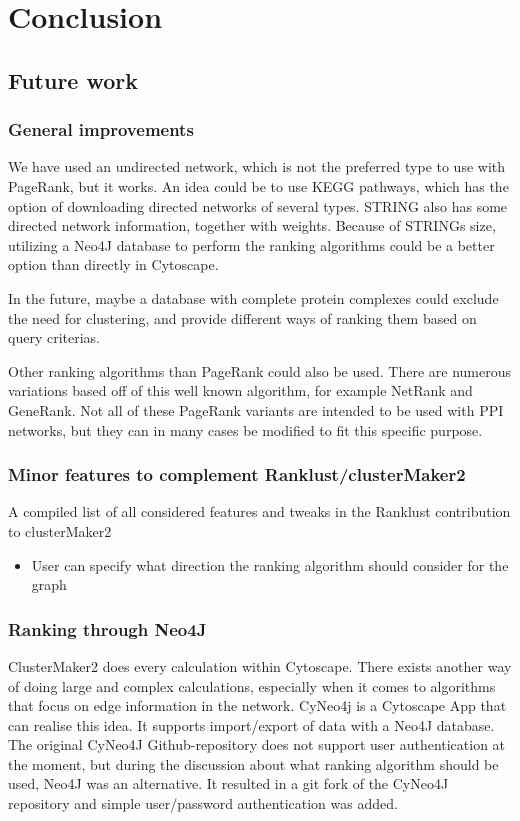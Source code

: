\part{Conclusion}
\label{pa:conclusion}
\chapter{Future work}
\section{General improvements}
We have used an undirected network, which is not the preferred type to use with
PageRank, but it works. An idea could be to use KEGG pathways\cite{kegg}, which
has the option of downloading directed networks of several types.
STRING\cite{str} also has some directed network information, together with
weights. Because of STRINGs size, utilizing a Neo4J database to perform the
ranking algorithms could be a better option than directly in Cytoscape.

In the future, maybe a database with complete protein complexes could exclude
the need for clustering, and provide different ways of ranking them based on
query criterias.

Other ranking algorithms than PageRank could also be used. There are numerous
variations based off of this well known algorithm, for example NetRank and
GeneRank\cite{netrank,generank}. Not all of these PageRank variants are intended
to be used with PPI networks, but they can in many cases be modified to fit this
specific purpose.

\section{Minor features to complement Ranklust/clusterMaker2}
A compiled list of all considered features and tweaks in the Ranklust
contribution to clusterMaker2

\begin{itemize}
    \item User can specify what direction the ranking algorithm should consider
        for the graph
\end{itemize}

\section{Ranking through Neo4J}
ClusterMaker2 does every calculation within Cytoscape. There exists another way
of doing large and complex calculations, especially when it comes to algorithms
that focus on edge information in the network. CyNeo4j\cite{cyneo4j} is
a Cytoscape App that can realise this idea. It supports import/export of data
with a Neo4J\cite{neo4j} database. The original CyNeo4J Github-repository does
not support user authentication at the moment, but during the discussion about
what ranking algorithm should be used, Neo4J was an alternative. It resulted in
a git fork\cite{git-fork} of the CyNeo4J repository and simple user/password
authentication was added.

